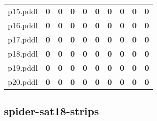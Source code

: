 \documentclass{article}
\begin{document}
\begin{tabular}{@{}lrrrrrrrrr@{}}
p15.pddl & \textbf{0} & \textbf{0} & \textbf{0} & \textbf{0} & \textbf{0} & \textbf{0} & \textbf{0} & \textbf{0} & \textbf{0} \\
p16.pddl & \textbf{0} & \textbf{0} & \textbf{0} & \textbf{0} & \textbf{0} & \textbf{0} & \textbf{0} & \textbf{0} & \textbf{0} \\
p17.pddl & \textbf{0} & \textbf{0} & \textbf{0} & \textbf{0} & \textbf{0} & \textbf{0} & \textbf{0} & \textbf{0} & \textbf{0} \\
p18.pddl & \textbf{0} & \textbf{0} & \textbf{0} & \textbf{0} & \textbf{0} & \textbf{0} & \textbf{0} & \textbf{0} & \textbf{0} \\
p19.pddl & \textbf{0} & \textbf{0} & \textbf{0} & \textbf{0} & \textbf{0} & \textbf{0} & \textbf{0} & \textbf{0} & \textbf{0} \\
p20.pddl & \textbf{0} & \textbf{0} & \textbf{0} & \textbf{0} & \textbf{0} & \textbf{0} & \textbf{0} & \textbf{0} & \textbf{0} \\
\end{tabular}

\hypertarget{coverage-spider-sat18-strips}{}
\subsection*{spider-sat18-strips}
\end{document}

